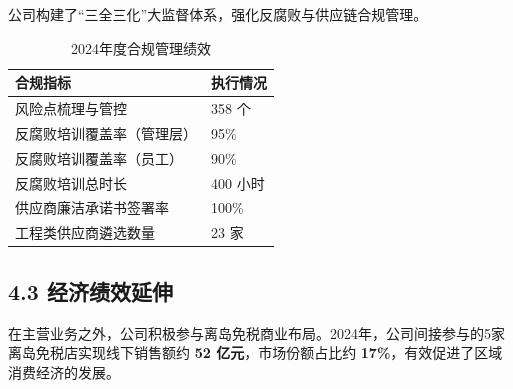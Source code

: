 \documentclass[a4paper,12pt]{article}
\begin{document}
公司构建了“三全三化”大监督体系，强化反腐败与供应链合规管理。

\begin{table}[H]
    \centering
    \caption{2024年度合规管理绩效}
    \label{tab:gov_compliance}
    \renewcommand{\arraystretch}{1.2}
    \begin{tabular}{p{9cm} p{4cm}}
        \toprule
        \textbf{合规指标} & \textbf{执行情况} \\
        \midrule
        风险点梳理与管控 & 358 个 \\
        反腐败培训覆盖率（管理层） & 95\% \\
        反腐败培训覆盖率（员工） & 90\% \\
        反腐败培训总时长 & 400 小时 \\
        供应商廉洁承诺书签署率 & 100\% \\
        工程类供应商遴选数量 & 23 家 \\
        \bottomrule
    \end{tabular}
\end{table}

\subsection{4.3 经济绩效延伸}

在主营业务之外，公司积极参与离岛免税商业布局。2024年，公司间接参与的5家离岛免税店实现线下销售额约 \textbf{52 亿元}，市场份额占比约 \textbf{17\%}，有效促进了区域消费经济的发展。
\end{document}
